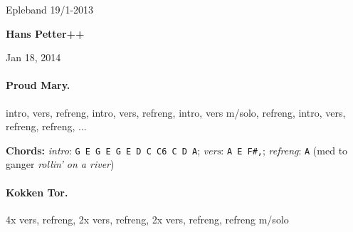 \documentclass[%
twoside,                 %
final,                   %
10pt]{article}
\begin{document}




\thispagestyle{empty}

\begin{center}
{\LARGE\bf
\begin{spacing}{1.25}
Epleband 19/1-2013
\end{spacing}
}
\end{center}




\begin{center}
{\bf Hans Petter++${}^{}$} \\ [0mm]
\end{center}

\begin{center}
\end{center}


\begin{center}
Jan 18, 2014
\end{center}

\vspace{1cm}





\vspace{1cm} %





\paragraph{Proud Mary.}
intro, vers, refreng, intro, vers, refreng, intro, vers m/solo, refreng,
intro, vers, refreng, refreng, ...

\textbf{Chords:} \emph{intro}: \Verb!G E G E G E D C C6 C D A!;
\emph{vers}: \Verb!A E F#,!; \emph{refreng}: \Verb!A! (med to ganger \emph{rollin' on a river})




\paragraph{Kokken Tor.}
4x vers, refreng, 2x vers, refreng, 2x vers, refreng, refreng m/solo
\end{document}
